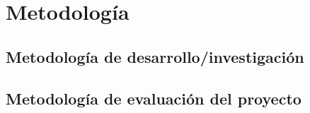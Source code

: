 \documentclass[11pt,letterpaper]{article}
\begin{document}
\section{Metodología}

\subsection{Metodología de desarrollo/investigación}


\subsection{Metodología de evaluación del proyecto}


%

%




\end{document}
